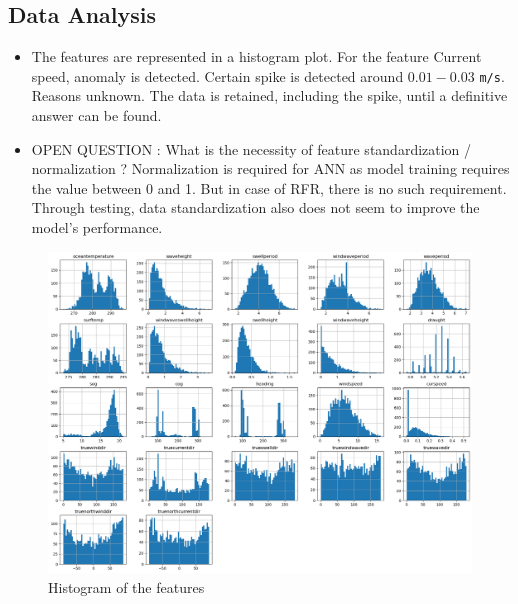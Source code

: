 \subsection{Data Analysis}
\begin{itemize}
    \item The features are represented in a histogram plot. For the feature Current speed, anomaly is detected. Certain spike is detected around $0.01 - 0.03$ \verb|m/s|. Reasons unknown. The data is retained, including the spike, until a definitive answer can be found.
    \item OPEN QUESTION : What is the necessity of feature standardization / normalization ? Normalization is required for ANN as model training requires the value between 0 and 1. But in case of RFR, there is no such requirement. Through testing, data standardization also does not seem to improve the model's performance. 
\end{itemize}




\begin{figure}
    \includegraphics[width=\linewidth,height=\textheight,keepaspectratio]{02_figures/outputhist.png}
    \caption{Histogram of the features}
    \label{sidewaysfig:hist1}
\end{figure}

\newpage

